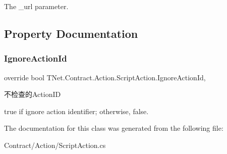 The \+\_\+url parameter. 



\subsection{Property Documentation}
\mbox{\label{class_t_net_1_1_contract_1_1_action_1_1_script_action_a3ca2a972899c24cb5d7590a4ff92137c}} 
\subsubsection{\texorpdfstring{Ignore\+Action\+Id}{IgnoreActionId}}
{\footnotesize\ttfamily override bool T\+Net.\+Contract.\+Action.\+Script\+Action.\+Ignore\+Action\+Id\hspace{0.3cm}{\ttfamily [get]}, {\ttfamily [protected]}}



不检查的\+Action\+ID 

{\ttfamily true} if ignore action identifier; otherwise, {\ttfamily false}.

The documentation for this class was generated from the following file\+:\begin{DoxyCompactItemize}
\item 
Contract/\+Action/Script\+Action.\+cs\end{DoxyCompactItemize}
